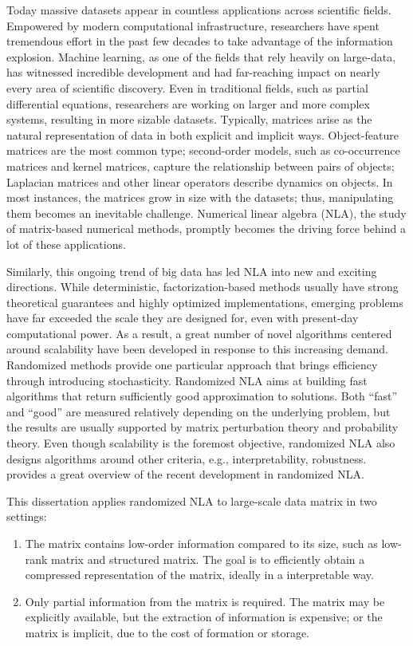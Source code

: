 Today massive datasets appear in countless applications across scientific
fields. Empowered by modern computational infrastructure, researchers have spent
tremendous effort in the past few decades to take advantage of the information
explosion. Machine learning, as one of the fields that rely heavily on 
large\hyp{}data, has witnessed incredible development and had far\hyp{}reaching
impact on nearly every area of scientific discovery. Even in traditional fields,
such as partial differential equations, researchers are working on larger and
more complex systems, resulting in more sizable datasets. Typically, matrices
arise as the natural representation of data in both explicit and implicit ways.
Object\hyp{}feature matrices are the most common type; second\hyp{}order models,
such as co-occurrence matrices and kernel matrices, capture the relationship
between pairs of objects; Laplacian matrices and other linear operators describe
dynamics on objects. In most instances, the matrices grow in size with the
datasets; thus, manipulating them becomes an inevitable challenge. Numerical
linear algebra (NLA), the study of matrix\hyp{}based numerical methods,
promptly becomes the driving force behind a lot of these applications.

Similarly, this ongoing trend of big data has led NLA into new and exciting
directions. While deterministic, factorization\hyp{}based methods usually have
strong theoretical guarantees and highly optimized implementations, emerging
problems have far exceeded the scale they are designed for, even with 
present\hyp{}day computational power. As a result, a great number of novel
algorithms centered around scalability have been developed in response to this
increasing demand. Randomized methods provide one particular approach that
brings efficiency through introducing stochasticity. Randomized NLA aims at
building fast algorithms that return sufficiently good approximation to
solutions. Both ``fast'' and ``good'' are measured relatively depending on the
underlying problem, but the results are usually supported by matrix perturbation
theory and probability theory. Even though scalability is the foremost
objective, randomized NLA also designs algorithms around other criteria, e.g.,
interpretability, robustness. \citet{drineas2016randnla} provides a great
overview of the recent development in randomized NLA.

This dissertation applies randomized NLA to large-scale data matrix in two
settings:
\begin{enumerate}
	\item The matrix contains low\hyp{}order information compared to its size,
	such as low\hyp{}rank matrix and structured matrix. The goal is to
	efficiently obtain a compressed representation of the matrix, ideally in a
	interpretable way.
	\item Only partial information from the matrix is required. The matrix
	may be explicitly available, but the extraction of information is expensive;
	or the matrix is implicit, due to the cost of formation or storage.
\end{enumerate}

